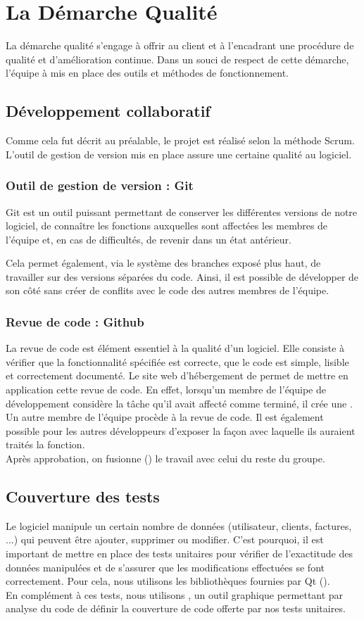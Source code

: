\chapter{La Démarche Qualité}
La démarche qualité s'engage à offrir au client et à l'encadrant une procédure de qualité et d'amélioration continue. 
Dans un souci de respect de cette démarche, l'équipe à mis en place des outils et méthodes de fonctionnement. 
\section{Développement collaboratif}
Comme cela fut décrit au préalable, le projet est réalisé selon la méthode Scrum. L'outil de gestion de version  mis en place assure une certaine qualité au logiciel.
\subsection{Outil de gestion de version : Git}
Git est un outil puissant permettant de conserver les différentes versions de notre logiciel, de connaître les fonctions auxquelles sont affectées les membres de l'équipe et, en cas de difficultés, de revenir dans un état antérieur. 

Cela permet également, via le système des branches exposé plus haut, de travailler sur des versions séparées du code. Ainsi, il est possible de développer de son côté sans créer de conflits avec le code des autres membres de l'équipe. 
\subsection{Revue de code : Github}
La revue de code est élément essentiel à la qualité d'un logiciel. Elle consiste à vérifier que la fonctionnalité spécifiée est correcte, que le code est simple, lisible et correctement documenté. Le site web d'hébergement  de  permet de mettre en application cette revue de code. En effet, lorsqu'un membre de l'équipe de développement considère la tâche qu'il avait affecté comme terminé, il crée une . Un autre membre de l'équipe procède à la revue de code. Il est également possible pour les autres développeurs d'exposer la façon avec laquelle ils auraient traités la fonction. \\
Après approbation, on fusionne () le travail avec celui du reste du groupe. 
\section{Couverture des tests}
Le logiciel \FactDev manipule un certain nombre de données (utilisateur, clients, factures, ...) qui peuvent être ajouter, supprimer ou modifier. C'est pourquoi, il est important de mettre en place des tests unitaires pour vérifier de l'exactitude des données manipulées et de s'assurer que les modifications effectuées se font correctement. Pour cela, nous utilisons les bibliothèques fournies par Qt (). \\
En complément à ces tests, nous utilisons , un outil graphique permettant par analyse du code de définir la couverture de code offerte par nos tests unitaires. 
